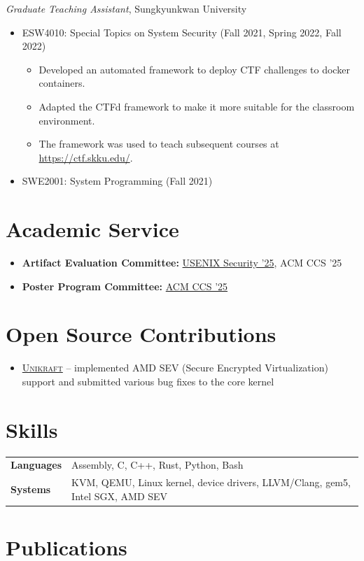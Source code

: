 \documentclass[a4paper,11pt]{article}
\begin{document}
\emph{Graduate Teaching Assistant}, Sungkyunkwan University
\begin{itemize}
	\item ESW4010: Special Topics on System Security (Fall 2021, Spring 2022, Fall 2022)
	      \begin{itemize}
		      \item Developed an automated framework to deploy CTF challenges to docker containers.
		      \item Adapted the CTFd framework to make it more suitable for the classroom environment.
		      \item The framework was used to teach subsequent courses at \url{https://ctf.skku.edu/}.
	      \end{itemize}
	\item SWE2001: System Programming (Fall 2021)
\end{itemize}

\section{Academic Service}
\begin{itemize}[nosep,after=\strut, leftmargin=2em, itemsep=3pt]
	\item \textbf{Artifact Evaluation Committee:} \href{https://secartifacts.github.io/usenixsec2025/organizers}{USENIX Security '25}, ACM CCS '25
	\item \textbf{Poster Program Committee:} \href{https://www.sigsac.org/ccs/CCS2025/call-for-posters-and-demos/}{ACM CCS '25}
\end{itemize}

\section{Open Source Contributions}

\begin{itemize}[nosep,after=\strut, leftmargin=2em, itemsep=3pt]
	\item \href{https://github.com/unikraft/unikraft/commits/staging/?author=kha-dinh}{\textsc{Unikraft}} -- implemented AMD SEV (Secure Encrypted Virtualization) support and submitted various bug fixes to the core kernel
\end{itemize}

\section{Skills}
\begin{tabularx}{\linewidth}{@{}l X@{}}
	\textbf{Languages} & Assembly, C, C++, Rust, Python, Bash                                          \\[6pt]
	\textbf{Systems}   & KVM, QEMU, Linux kernel, device drivers, LLVM/Clang, gem5, Intel SGX, AMD SEV \\
\end{tabularx}
\section{Publications}
\nocite{*}
\printbibliography[heading=none]
\vfill
{}
\end{document}
